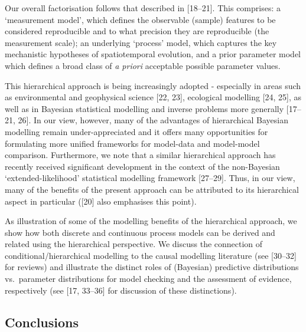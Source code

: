 \documentclass[10pt,letterpaper]{article}
\begin{document}
Our overall factorisation follows that described in {[}18--21{]}. This
comprises: a `measurement model', which defines the observable (sample)
features to be considered reproducible and to what precision they are
reproducible (the measurement scale); an underlying `process' model,
which captures the key mechanistic hypotheses of spatiotemporal
evolution, and a prior parameter model which defines a broad class of
\emph{a priori} acceptable possible parameter values.

This hierarchical approach is being increasingly adopted - especially in
areas such as environmental and geophysical science {[}22, 23{]},
ecological modelling {[}24, 25{]}, as well as in Bayesian statistical
modelling and inverse problems more generally {[}17--21, 26{]}. In our
view, however, many of the advantages of hierarchical Bayesian modelling
remain under-appreciated and it offers many opportunities for
formulating more unified frameworks for model-data and model-model
comparison. Furthermore, we note that a similar hierarchical approach
has recently received significant development in the context of the
non-Bayesian `extended-likelihood' statistical modelling framework
{[}27--29{]}. Thus, in our view, many of the benefits of the present
approach can be attributed to its hierarchical aspect in particular
({[}20{]} also emphasises this point).

As illustration of some of the modelling benefits of the hierarchical
approach, we show how both discrete and continuous process models can be
derived and related using the hierarchical perspective. We discuss the
connection of conditional/hierarchical modelling to the causal modelling
literature (see {[}30--32{]} for reviews) and illustrate the distinct
roles of (Bayesian) predictive distributions vs.~parameter distributions
for model checking and the assessment of evidence, respectively (see
{[}17, 33--36{]} for discussion of these distinctions).

\subsection{Conclusions}\label{conclusions}
\end{document}
